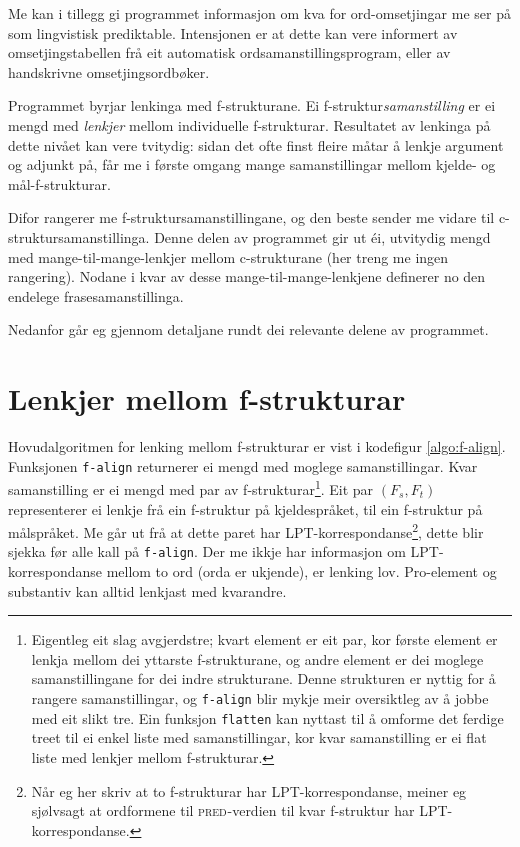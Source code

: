 \documentclass[12pt,a4paper,oneside,draft]{report}
\newcommand{\F}[2]{\textsc{#1}\ensuremath{_{#2}}}
\newcommand{\PRED}{\F{pred}{}}
\begin{document}
Me kan i tillegg gi programmet informasjon om kva for ord-omsetjingar
me ser på som lingvistisk prediktable. Intensjonen er at dette kan
vere informert av omsetjingstabellen frå eit automatisk
ordsamanstillingsprogram, eller av handskrivne omsetjingsordbøker.

Programmet byrjar lenkinga med f\hyp{}strukturane. Ei
f\hyp{}struktur\emph{samanstilling} er ei mengd med \emph{lenkjer} mellom
individuelle f\hyp{}strukturar. Resultatet av lenkinga på dette nivået kan
vere tvitydig: sidan det ofte finst fleire måtar å lenkje argument og
adjunkt på, får me i første omgang mange samanstillingar mellom
kjelde- og mål-f\hyp{}strukturar.

Difor rangerer me f\hyp{}struktursamanstillingane, og den beste sender me
vidare til c\hyp{}struktursamanstillinga. Denne delen av programmet gir ut
éi, utvitydig mengd med mange-til-mange-lenkjer mellom c\hyp{}strukturane
(her treng me ingen rangering). Nodane i kvar av desse
mange-til-mange-lenkjene definerer no den endelege
frasesamanstillinga.

Nedanfor går eg gjennom detaljane rundt dei relevante delene av
programmet.

\section{Lenkjer mellom f\hyp{}strukturar}
\label{sec-4.1}

\label{SEC:impl-f-lenking}

Hovudalgoritmen for lenking mellom f\hyp{}strukturar er vist i kodefigur
\ref{algo:f-align}. Funksjonen \texttt{f-align} returnerer ei mengd med
moglege samanstillingar. Kvar samanstilling er ei mengd med par av
f\hyp{}strukturar\footnote{Eigentleg eit slag avgjerdstre; kvart element er eit par, kor
        første element er lenkja mellom dei yttarste f\hyp{}strukturane, og
        andre element er dei moglege samanstillingane for dei indre
        strukturane. Denne strukturen er nyttig for å rangere
        samanstillingar, og \texttt{f-align} blir mykje meir oversiktleg av å
        jobbe med eit slikt tre. Ein funksjon \texttt{flatten} kan nyttast
        til å omforme det ferdige treet til ei enkel liste med
        samanstillingar, kor kvar samanstilling er ei flat liste med
        lenkjer mellom f\hyp{}strukturar. }. Eit par $(F_s,F_t)$ representerer ei lenkje frå
ein f\hyp{}struktur på kjeldespråket, til ein f\hyp{}struktur på målspråket. Me
går ut frå at dette paret har LPT\hyp{}korrespondanse\footnote{Når eg her skriv at to f\hyp{}strukturar har LPT\hyp{}korrespondanse,
        meiner eg sjølvsagt at ordformene til \PRED{}-verdien til kvar
        f\hyp{}struktur har LPT\hyp{}korrespondanse. }, dette blir
sjekka før alle kall på \texttt{f-align}. Der me ikkje har informasjon om
LPT\hyp{}korrespondanse mellom to ord (orda er ukjende), er lenking
lov. Pro-element og substantiv kan alltid lenkjast med kvarandre.
\end{document}
